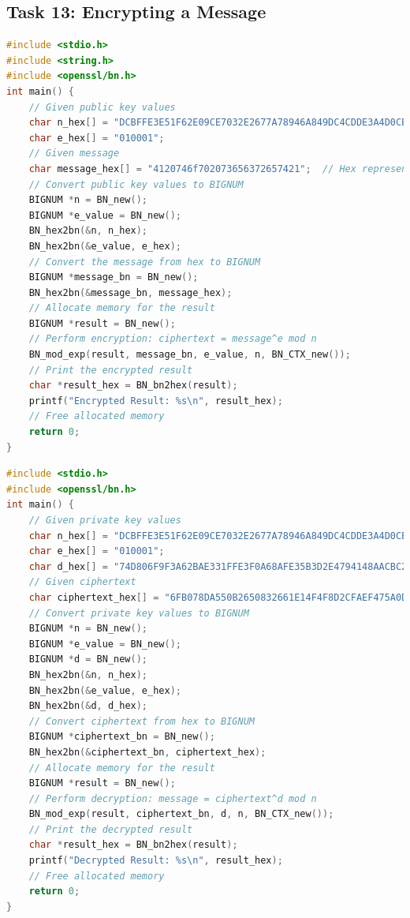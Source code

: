 \documentclass[a4paper]{article}
\begin{document}
\subsection{Task 13: Encrypting a Message}
\begin{lstlisting}[caption={C Program Code for Encrypt},label={lst:task4.13-1},language=C,breaklines=true]
#include <stdio.h>
#include <string.h>
#include <openssl/bn.h>
int main() {
    // Given public key values
    char n_hex[] = "DCBFFE3E51F62E09CE7032E2677A78946A849DC4CDDE3A4D0CB81629242FB1A5";
    char e_hex[] = "010001";
    // Given message
    char message_hex[] = "4120746f702073656372657421";  // Hex representation of "A top secret!"
    // Convert public key values to BIGNUM
    BIGNUM *n = BN_new();
    BIGNUM *e_value = BN_new();
    BN_hex2bn(&n, n_hex);
    BN_hex2bn(&e_value, e_hex);
    // Convert the message from hex to BIGNUM
    BIGNUM *message_bn = BN_new();
    BN_hex2bn(&message_bn, message_hex);
    // Allocate memory for the result
    BIGNUM *result = BN_new();
    // Perform encryption: ciphertext = message^e mod n
    BN_mod_exp(result, message_bn, e_value, n, BN_CTX_new());
    // Print the encrypted result
    char *result_hex = BN_bn2hex(result);
    printf("Encrypted Result: %s\n", result_hex);
    // Free allocated memory
    return 0;
}

\end{lstlisting}
\begin{lstlisting}[caption={C Program Code for Evaluation},label={lst:task4.13-2},language=C,breaklines=true]
#include <stdio.h>
#include <openssl/bn.h>
int main() {
    // Given private key values
    char n_hex[] = "DCBFFE3E51F62E09CE7032E2677A78946A849DC4CDDE3A4D0CB81629242FB1A5";
    char e_hex[] = "010001";
    char d_hex[] = "74D806F9F3A62BAE331FFE3F0A68AFE35B3D2E4794148AACBC26AA381CD7D30D";
    // Given ciphertext
    char ciphertext_hex[] = "6FB078DA550B2650832661E14F4F8D2CFAEF475A0DF3A75CACDC5DE5CFC5FADC";
    // Convert private key values to BIGNUM
    BIGNUM *n = BN_new();
    BIGNUM *e_value = BN_new();
    BIGNUM *d = BN_new();
    BN_hex2bn(&n, n_hex);
    BN_hex2bn(&e_value, e_hex);
    BN_hex2bn(&d, d_hex);
    // Convert ciphertext from hex to BIGNUM
    BIGNUM *ciphertext_bn = BN_new();
    BN_hex2bn(&ciphertext_bn, ciphertext_hex);
    // Allocate memory for the result
    BIGNUM *result = BN_new();
    // Perform decryption: message = ciphertext^d mod n
    BN_mod_exp(result, ciphertext_bn, d, n, BN_CTX_new());
    // Print the decrypted result
    char *result_hex = BN_bn2hex(result);
    printf("Decrypted Result: %s\n", result_hex);
    // Free allocated memory
    return 0;
}
\end{lstlisting} 
\end{document}
